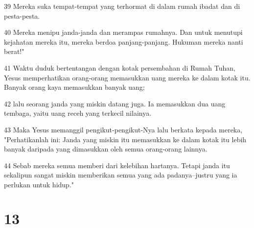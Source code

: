 \par 39 Mereka suka tempat-tempat yang terhormat di dalam rumah ibadat dan di pesta-pesta.
\par 40 Mereka menipu janda-janda dan merampas rumahnya. Dan untuk menutupi kejahatan mereka itu, mereka berdoa panjang-panjang. Hukuman mereka nanti berat!"
\par 41 Waktu duduk bertentangan dengan kotak persembahan di Rumah Tuhan, Yesus memperhatikan orang-orang memasukkan uang mereka ke dalam kotak itu. Banyak orang kaya memasukkan banyak uang;
\par 42 lalu seorang janda yang miskin datang juga. Ia memasukkan dua uang tembaga, yaitu uang receh yang terkecil nilainya.
\par 43 Maka Yesus memanggil pengikut-pengikut-Nya lalu berkata kepada mereka, "Perhatikanlah ini: Janda yang miskin itu memasukkan ke dalam kotak itu lebih banyak daripada yang dimasukkan oleh semua orang-orang lainnya.
\par 44 Sebab mereka semua memberi dari kelebihan hartanya. Tetapi janda itu sekalipun sangat miskin memberikan semua yang ada padanya--justru yang ia perlukan untuk hidup."

\chapter{13}

